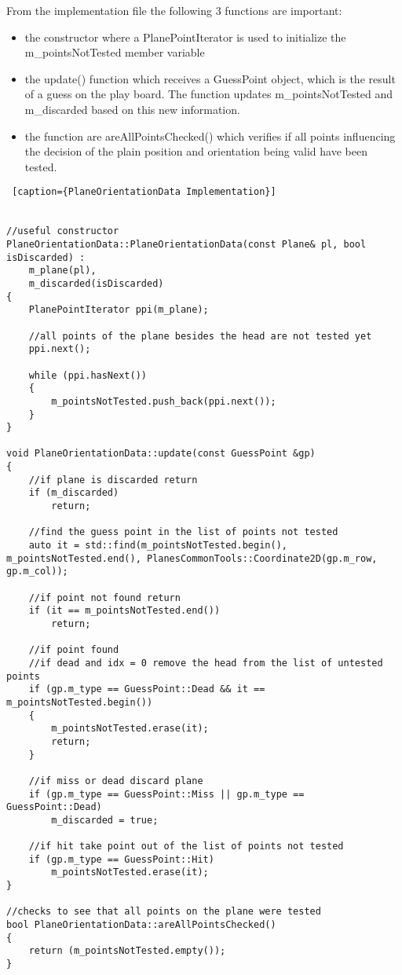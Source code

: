 From the implementation file the following 3 functions are important: \begin{itemize}
	\item the constructor where a PlanePointIterator is used to initialize the m\_pointsNotTested member variable
	\item the update() function which receives a GuessPoint object, which is the result of a guess on the play board. The function updates m\_pointsNotTested and m\_discarded based on this new information.
	\item the function are areAllPointsChecked() which verifies if all points influencing the decision of the plain position and orientation being valid have been tested.
\end{itemize}

\begin{lstlisting} [caption={PlaneOrientationData Implementation}]


//useful constructor
PlaneOrientationData::PlaneOrientationData(const Plane& pl, bool isDiscarded) :
	m_plane(pl),
	m_discarded(isDiscarded)
{
	PlanePointIterator ppi(m_plane);
	
	//all points of the plane besides the head are not tested yet
	ppi.next();

	while (ppi.hasNext())
	{
		m_pointsNotTested.push_back(ppi.next());
	}
}

void PlaneOrientationData::update(const GuessPoint &gp)
{
	//if plane is discarded return
	if (m_discarded)
		return;
	
	//find the guess point in the list of points not tested
	auto it = std::find(m_pointsNotTested.begin(), m_pointsNotTested.end(), PlanesCommonTools::Coordinate2D(gp.m_row, gp.m_col));
	
	//if point not found return
	if (it == m_pointsNotTested.end())
		return;
	
	//if point found
	//if dead and idx = 0 remove the head from the list of untested points
	if (gp.m_type == GuessPoint::Dead && it == m_pointsNotTested.begin())
	{
		m_pointsNotTested.erase(it);
		return;
	}
	
	//if miss or dead discard plane
	if (gp.m_type == GuessPoint::Miss || gp.m_type == GuessPoint::Dead)
		m_discarded = true;
	
	//if hit take point out of the list of points not tested
	if (gp.m_type == GuessPoint::Hit)
		m_pointsNotTested.erase(it);
}

//checks to see that all points on the plane were tested
bool PlaneOrientationData::areAllPointsChecked()
{
	return (m_pointsNotTested.empty());
}

\end{lstlisting}

